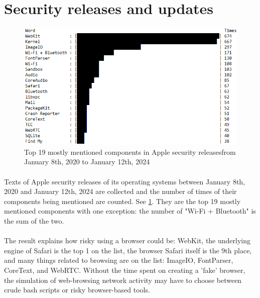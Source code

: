 \documentclass[mscthesis]{usiinfthesis}
\begin{document}
\section{Security releases and updates}
\begin{figure}[H]
  \includegraphics[width=\textwidth]{data/apple_security_releases/result.png}
  \caption{Top 19 mostly mentioned components in Apple security releases\newline from January 8th, 2020 to January 12th, 2024}
  \label{fig:apple-sec-release}
\end{figure}
\paragraph{}
Texts of Apple security releases of its operating systems between January 8th, 2020 and January 12th, 2024 are collected and the number of times of their components being mentioned are counted. See \cref{fig:apple-sec-release}. They are the top 19 mostly mentioned components with one exception: the number of "Wi-Fi + Bluetooth" is the sum of the two.
\paragraph{}
The result explains how risky using a browser could be: WebKit, the underlying engine of Safari is the top 1 on the list, the browser Safari itself is the 9th place, and many things related to browsing are on the list: ImageIO, FontParser, CoreText, and WebRTC. Without the time spent on creating a 'fake' browser, the simulation of web-browsing network activity may have to choose between crude bash scripts or risky browser-based tools.
\end{document}
